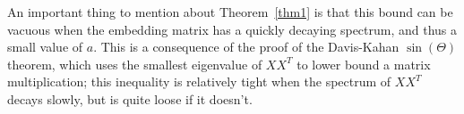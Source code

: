 An important thing to mention about Theorem~\ref{thm1} is that this bound can be vacuous when the embedding matrix has a quickly decaying spectrum, and thus a small value of $a$.
This is a consequence of the proof of the Davis-Kahan $\sin(\Theta)$ theorem, which uses the smallest eigenvalue of $XX^T$ to lower bound a matrix multiplication; this inequality is relatively tight when the spectrum of $XX^T$ decays slowly, but is quite loose if it doesn't.


